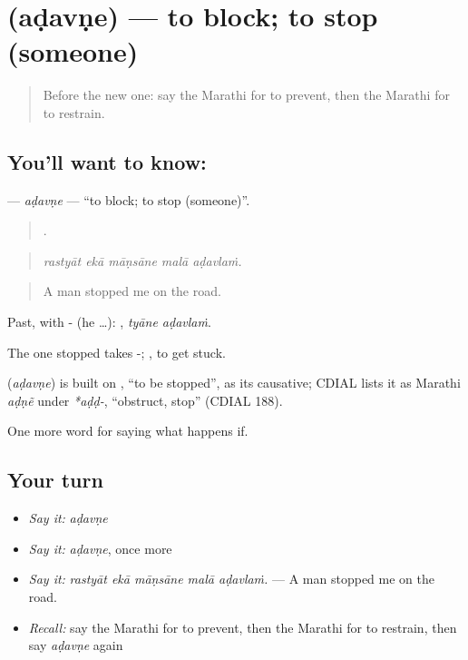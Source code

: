 \section[\texorpdfstring{\mr{अडवणे} (aḍavṇe)}{अडवणे (aḍavṇe)}]{ (aḍavṇe) — to block; to stop (someone)}

\label{lesson:MR-C386-adavne}



\begin{quote}
Before the new one: say the Marathi for to prevent, then the Marathi for to restrain.
\end{quote}

\subsection*{You'll want to know: }
\textbf{} — \emph{aḍavṇe} — \textquotedblleft{}to block; to stop (someone)\textquotedblright{}.

\begin{quote}
    .
\end{quote}

\begin{quote}
\emph{rastyāt ekā māṇsāne malā aḍavlaṁ.}
\end{quote}

\begin{quote}
A man stopped me on the road.
\end{quote}

Past, with - (he …):  , \emph{tyāne aḍavlaṁ}.

The one stopped takes -; , to get stuck.

\begin{cousinweb}
\textbf{} (\emph{aḍavṇe}) is built on , \textquotedblleft{}to be stopped\textquotedblright{}, as its causative; CDIAL lists it as Marathi \emph{aḍṇẽ} under \emph{*aḍḍ-}, \textquotedblleft{}obstruct, stop\textquotedblright{} (CDIAL 188).
\end{cousinweb}

\begin{grammarlens}[title={What you've built}]
One more word for saying what happens if.
\end{grammarlens}

\subsection*{Your turn}
\begin{itemize}
\raggedright
  \item \emph{Say it:} \emph{aḍavṇe}
  \item \emph{Say it:} \emph{aḍavṇe}, once more
  \item \emph{Say it:} \emph{rastyāt ekā māṇsāne malā aḍavlaṁ.} — A man stopped me on the road.
  \item \emph{Recall:} say the Marathi for to prevent, then the Marathi for to restrain, then say \emph{aḍavṇe} again
\end{itemize}


